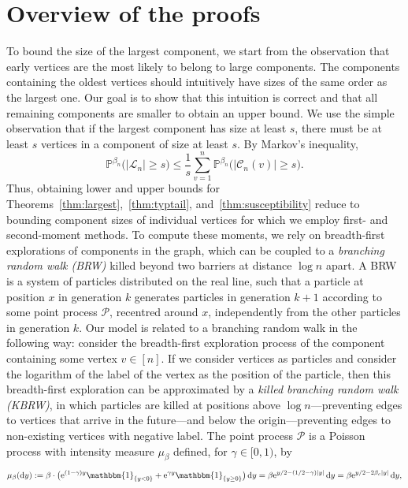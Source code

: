 \documentclass[a4paper, a4wide, 10pt, reqno]{amsart}
\theoremstyle{plain}
\theoremstyle{definition}
\numberwithin{equation}{section}
\newcommand{\Prob}{\mathbb{P}}
\newcommand{\sC}{{\mathscr C}}
\newcommand{\sL}{{\mathscr L}}
\newcommand{\re}{{\mathrm e}}
\newcommand{\ind}[1]{\mathbbm{1}_{\{#1\}}}
\newcommand{\rd}{\mathrm{d}}
\begin{document}
\section{Overview of the proofs}\label{sec:overview}
To bound the size of the largest component, we start from the observation that early vertices are the most likely to belong to large components.  
The components containing the oldest vertices should intuitively have sizes of the same order as the largest one.  
Our goal is to show that this intuition is correct and that all remaining components are smaller to obtain an upper bound. We use the simple observation that if the largest component has size at least $s$, there must be at least $s$ vertices in a component of size at least $s$. By Markov's inequality,
\[
\Prob^{\beta_n}\big(|\sL_n|\ge s\big)\le \frac{1}{s}\sum_{v=1}^n\Prob^{\beta_n}\big(|\sC_n(v)|\ge s\big).
\]
Thus, obtaining lower and upper bounds for Theorems~\ref{thm:largest},~\ref{thm:typtail}, and~\ref{thm:susceptibility} reduce to bounding component sizes of individual
vertices for which we employ first- and second-moment methods.
To compute these moments,
we rely on breadth-first explorations of components in the graph, which can be coupled to a \emph{branching random walk (BRW)} killed beyond two barriers at distance $\log n$ apart. A BRW is a system of particles distributed on the real line, such that a particle at position $x$ in generation $k$ generates particles in generation $k+1$ according to some point process $\mathscr P$, recentred around $x$, independently from the other particles in generation $k$. Our model is related to a branching random walk in the following way: consider the breadth-first exploration process of the component containing some vertex $v\in [n]$. If we consider vertices as particles and consider the logarithm of the label of the vertex as the position of the particle, then this breadth-first exploration can be approximated by a \emph{killed branching random walk (KBRW)}, in which particles are killed at positions above $\log n$---preventing edges to vertices that arrive in the future---and below the origin---preventing edges to non-existing vertices with negative label. The point process $\mathscr P$ is a Poisson process with intensity measure $\mu_\beta$ defined, for $\gamma\in[0, 1)$, by
\begin{equation}
	\label{eq:mu_beta}
	\mu_\beta(\rd y) := \beta\cdot \big(\re^{(1-\gamma)y}\ind{y<0}+ \re^{\gamma y}\ind{y\ge 0}\big)\,\rd y = \beta \re^{y/2 - (1/2-\gamma)|y|}\,\rd y = \beta \re^{y/2 - 2\beta_c|y|}\,\rd y,
\end{equation}
\end{document}
